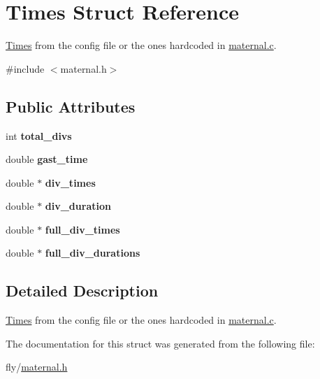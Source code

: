 \hypertarget{structTimes}{
\section{Times Struct Reference}
\label{structTimes}
}


\hyperlink{structTimes}{Times} from the config file or the ones hardcoded in \hyperlink{maternal_8c}{maternal.c}.  


{\ttfamily \#include $<$maternal.h$>$}\subsection*{Public Attributes}
\begin{DoxyCompactItemize}
\item 
\hypertarget{structTimes_aa03dfc0770b2b06d59901698a4130063}{
int {\bfseries total\_\-divs}}
\label{structTimes_aa03dfc0770b2b06d59901698a4130063}

\item 
\hypertarget{structTimes_a889bcd408d5a1e9cc007e563be43d82c}{
double {\bfseries gast\_\-time}}
\label{structTimes_a889bcd408d5a1e9cc007e563be43d82c}

\item 
\hypertarget{structTimes_aecd01bfb83cbbf8296611934b4ccaef5}{
double $\ast$ {\bfseries div\_\-times}}
\label{structTimes_aecd01bfb83cbbf8296611934b4ccaef5}

\item 
\hypertarget{structTimes_a6e7ac1ee2797e2005e67bae5211f4c31}{
double $\ast$ {\bfseries div\_\-duration}}
\label{structTimes_a6e7ac1ee2797e2005e67bae5211f4c31}

\item 
\hypertarget{structTimes_ad46b7b5377652649ee859f8f745c8c8b}{
double $\ast$ {\bfseries full\_\-div\_\-times}}
\label{structTimes_ad46b7b5377652649ee859f8f745c8c8b}

\item 
\hypertarget{structTimes_af57656232bfae1eae511d07210200b64}{
double $\ast$ {\bfseries full\_\-div\_\-durations}}
\label{structTimes_af57656232bfae1eae511d07210200b64}

\end{DoxyCompactItemize}


\subsection{Detailed Description}
\hyperlink{structTimes}{Times} from the config file or the ones hardcoded in \hyperlink{maternal_8c}{maternal.c}. 

The documentation for this struct was generated from the following file:\begin{DoxyCompactItemize}
\item 
fly/\hyperlink{maternal_8h}{maternal.h}\end{DoxyCompactItemize}
